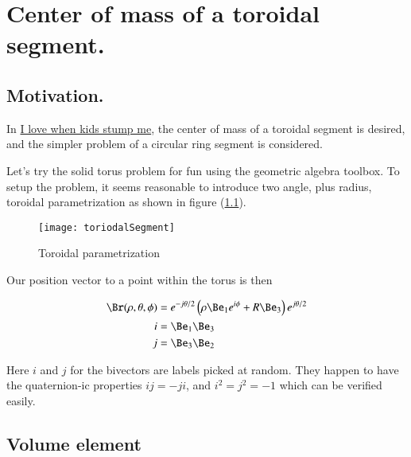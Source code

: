%
%

\chapter{Center of mass of a toroidal segment.}
\label{chap:torusCenterOfMass}
{}
\date{May 15, 2010}

\beginArtNoToc

\section{Motivation.}

In \href{http://samjshah.com/2010/05/05/i-love-when-kids-stump-me/}{I love when kids stump me}, the center of mass of a toroidal segment is desired, and the simpler problem of a circular ring segment is considered.

Let's try the solid torus problem for fun using the geometric algebra toolbox.  To setup the problem, it seems reasonable to introduce two angle, plus radius, toroidal parametrization as shown in figure (\ref{fig:toriodalSegment}).

\begin{figure}[htp]
\centering
\texttt{[image: toriodalSegment]}
\caption{Toroidal parametrization}\label{fig:toriodalSegment}
\end{figure}

Our position vector to a point within the torus is then

\begin{subequations}
\begin{align}\label{eqn:torusCenterOfMass:1}
\Br(\rho, \theta, \phi) &= e^{-j\theta/2} \left( \rho \Be_1 e^{ i \phi } + R \Be_3 \right) e^{j \theta/2} \\
i &= \Be_1 \Be_3 \\
j &= \Be_3 \Be_2 
\end{align}
\end{subequations}

Here $i$ and $j$ for the bivectors are labels picked at random.  They happen to have the quaternion-ic properties $i j = -j i$, and $i^2 = j^2 = -1$ which can be verified easily.

\section{Volume element}

